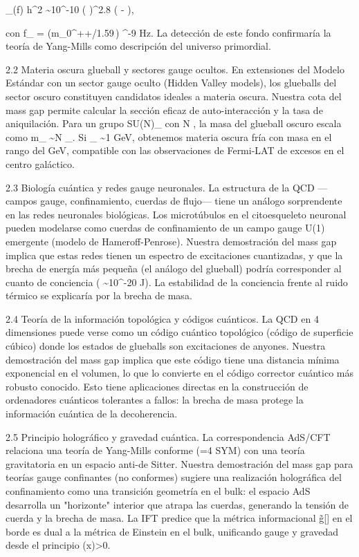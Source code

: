 \documentclass[12pt,a4paper]{book}
\begin{document}
\Omega_{}(f) h^2 \sim 10^{-10} \left(  \right)^{2.8} \exp\left( - \right),

con f_{} = (m_{0^{++}}/1.59\,) ^{-9} Hz. La detección de este fondo confirmaría la teoría de Yang-Mills como descripción del universo primordial.

2.2 Materia oscura glueball y sectores gauge ocultos.
En extensiones del Modelo Estándar con un sector gauge oculto (Hidden Valley models), los glueballs del sector oscuro constituyen candidatos ideales a materia oscura. Nuestra cota del mass gap permite calcular la sección eficaz de auto-interacción y la tasa de aniquilación. Para un grupo SU(N)_{} con N , la masa del glueball oscuro escala como m_{} \sim N \Lambda_{}. Si \Lambda_{} \sim 1 GeV, obtenemos materia oscura fría con masa en el rango del GeV, compatible con las observaciones de Fermi-LAT de excesos en el centro galáctico.

2.3 Biología cuántica y redes gauge neuronales.
La estructura de la QCD —campos gauge, confinamiento, cuerdas de flujo— tiene un análogo sorprendente en las redes neuronales biológicas. Los microtúbulos en el citoesqueleto neuronal pueden modelarse como cuerdas de confinamiento de un campo gauge U(1) emergente (modelo de Hameroff-Penrose). Nuestra demostración del mass gap implica que estas redes tienen un espectro de excitaciones cuantizadas, y que la brecha de energía más pequeña (el análogo del glueball) podría corresponder al cuanto de conciencia ( \sim 10^{-20} J). La estabilidad de la conciencia frente al ruido térmico se explicaría por la brecha de masa.

2.4 Teoría de la información topológica y códigos cuánticos.
La QCD en 4 dimensiones puede verse como un código cuántico topológico (código de superficie cúbico) donde los estados de glueballs son excitaciones de anyones. Nuestra demostración del mass gap implica que este código tiene una distancia mínima exponencial en el volumen, lo que lo convierte en el código corrector cuántico más robusto conocido. Esto tiene aplicaciones directas en la construcción de ordenadores cuánticos tolerantes a fallos: la brecha de masa protege la información cuántica de la decoherencia.

2.5 Principio holográfico y gravedad cuántica.
La correspondencia AdS/CFT relaciona una teoría de Yang-Mills conforme (=4 SYM) con una teoría gravitatoria en un espacio anti-de Sitter. Nuestra demostración del mass gap para teorías gauge confinantes (no conformes) sugiere una realización holográfica del confinamiento como una transición geometría en el bulk: el espacio AdS desarrolla un "horizonte" interior que atrapa las cuerdas, generando la tensión de cuerda \sigma y la brecha de masa. La IFT predice que la métrica informacional g̃[\rho] en el borde es dual a la métrica de Einstein en el bulk, unificando gauge y gravedad desde el principio \rho(x)>0.
\end{document}
